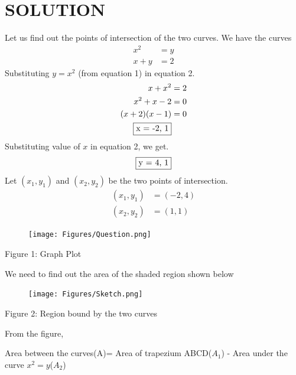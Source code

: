 \documentclass[journal,12pt,twocolumn]{IEEEtran}
\begin{document}
\section{\textbf{SOLUTION}}
Let us find out the points of intersection of the two curves. We have the curves
\begin{align}
    x^2 &= y\\
    x + y &= 2
\end{align}
Substituting $y = x^2$ (from equation 1) in equation 2.
\begin{align}
    x + x^2 &= 2\\
    x^2 + x - 2 &= 0\\
    (x + 2)(x - 1) &= 0\\
    \fbox{x = -2, 1}
\end{align}
Substituting value of $x$ in equation 2, we get.
\begin{align}
    \fbox{y = 4, 1}
\end{align}
Let $(x_1,y_1)$ and $(x_2,y_2)$ be the two points of intersection.
\begin{align}
    (x_1,y_1) &= (-2,4)\\
    (x_2,y_2) &= (1,1)
\end{align}
\begin{figure}[H]
    \centering
    \texttt{[image: Figures/Question.png]}
\end{figure}
\begin{center}
    Figure 1: Graph Plot
\end{center}
We need to find out the area of the shaded region shown below
\begin{figure}[H]
    \centering
    \texttt{[image: Figures/Sketch.png]}
\end{figure}
\begin{center}
    Figure 2: Region bound by the two curves
\end{center}
From the figure,
\begin{center}
Area between the curves(A)= Area of trapezium ABCD($A_1$) - Area under the curve $x^2 = y$($A_2$)
\end{center}

\clearpage
\end{document}
